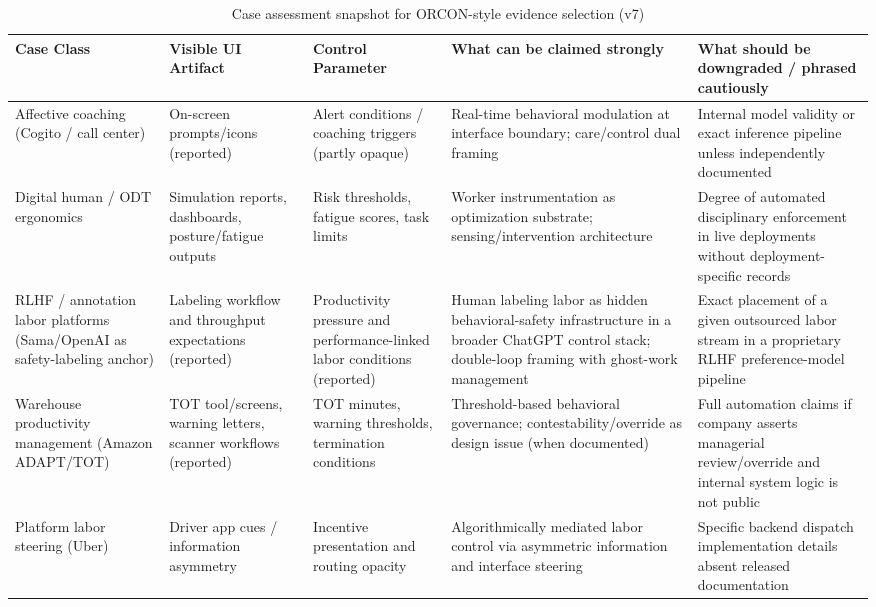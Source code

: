 \documentclass[runningheads]{llncs}
\begin{document}
\begin{table}
\caption{Case assessment snapshot for ORCON-style evidence selection (v7)}\label{tab:case-assessment}
\centering
\small
\begin{tabular}{|p{2.4cm}|p{2.8cm}|p{2.3cm}|p{3.1cm}|p{3.1cm}|}
\hline
\textbf{Case Class} & \textbf{Visible UI Artifact} & \textbf{Control Parameter} & \textbf{What can be claimed strongly} & \textbf{What should be downgraded / phrased cautiously} \\
\hline
Affective coaching (Cogito / call center) & On-screen prompts/icons (reported) & Alert conditions / coaching triggers (partly opaque) & Real-time behavioral modulation at interface boundary; care/control dual framing \cite{delagarza2019time,cogito2023businesswire} & Internal model validity or exact inference pipeline unless independently documented \\
\hline
Digital human / ODT ergonomics & Simulation reports, dashboards, posture/fatigue outputs & Risk thresholds, fatigue scores, task limits & Worker instrumentation as optimization substrate; sensing/intervention architecture \cite{siemensPSXHuman,siemensHumanAdvanced} & Degree of automated disciplinary enforcement in live deployments without deployment-specific records \\
\hline
RLHF / annotation labor platforms (Sama/OpenAI as safety-labeling anchor) & Labeling workflow and throughput expectations (reported) & Productivity pressure and performance-linked labor conditions (reported) & Human labeling labor as hidden behavioral-safety infrastructure in a broader ChatGPT control stack; double-loop framing with ghost-work management \cite{perrigo2023time,gray2019ghost,kellogg2020algorithms} & Exact placement of a given outsourced labor stream in a proprietary RLHF preference-model pipeline \\
\hline
Warehouse productivity management (Amazon ADAPT/TOT) & TOT tool/screens, warning letters, scanner workflows (reported) & TOT minutes, warning thresholds, termination conditions & Threshold-based behavioral governance; contestability/override as design issue (when documented) \cite{gurley2022vice} & Full automation claims if company asserts managerial review/override and internal system logic is not public \\
\hline
Platform labor steering (Uber) & Driver app cues / information asymmetry & Incentive presentation and routing opacity & Algorithmically mediated labor control via asymmetric information and interface steering \cite{rosenblat2016uber} & Specific backend dispatch implementation details absent released documentation \\
\hline
\end{tabular}
\end{table}
\end{document}
